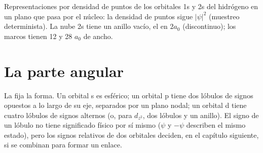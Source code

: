 \begin{omfigure}
\hspace{0.12\linewidth}%

{\small Representaciones por densidad de puntos de los orbitales 1s y 2s del hidrógeno en un plano
que pasa por el núcleo: la densidad de puntos sigue $|\psi|^2$ (muestreo
determinista). La nube 2s tiene un anillo vacío, el  en $2a_0$ (discontinuo);
los marcos tienen 12 y 28 $a_0$ de ancho.}
\end{omfigure}

\section{La parte angular}

La  fija la forma. Un orbital s es esférico; un orbital p tiene dos
lóbulos de signos opuestos a lo largo de su eje, separados por un plano nodal; un orbital d tiene
cuatro lóbulos de signos alternos (o, para $d_{z^2}$, dos lóbulos y un anillo). El signo
de un lóbulo no tiene significado físico por sí mismo ($\psi$ y $-\psi$ describen el mismo
estado), pero los signos relativos de dos orbitales deciden, en el capítulo siguiente,
si se combinan para formar un enlace.

